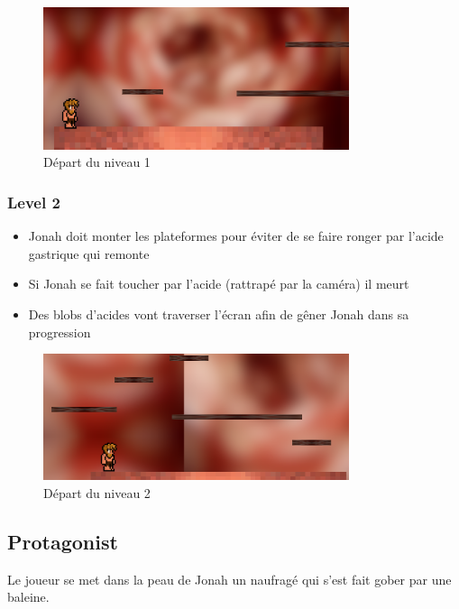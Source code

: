 \documentclass{prologArticle}
\begin{document}
\begin{figure}[H]
    \centering
    \includegraphics[width=0.8\textwidth]{res/level1.png}
    \caption{Départ du niveau 1}
\end{figure}

\subsubsection{Level 2}

\begin{itemize}
    \item Jonah doit monter les plateformes pour éviter de se faire ronger par l'acide gastrique qui remonte
    \item Si Jonah se fait toucher par l'acide (rattrapé par la caméra) il meurt
    \item Des blobs d'acides vont traverser l'écran afin de gêner Jonah dans sa progression
\end{itemize}

\begin{figure}[H]
    \centering
    \includegraphics[width=0.8\textwidth]{res/level2.png}
    \caption{Départ du niveau 2}
\end{figure}

\subsection{Protagonist}

Le joueur se met dans la peau de Jonah un naufragé qui s'est fait gober par une baleine.
\end{document}
